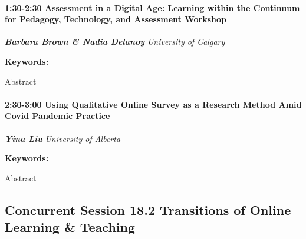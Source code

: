 \documentclass[
]{book}
\begin{document}
\begin{workshop}
\hypertarget{assessment-in-a-digital-age-learning-within-the-continuum-for-pedagogy-technology-and-assessment-workshop}{%
\paragraph*{\texorpdfstring{1:30-2:30 \textbar{} \textbf{Assessment in a
Digital Age: Learning within the Continuum for Pedagogy, Technology, and
Assessment} \textbar{}
Workshop}{1:30-2:30 \textbar{} Assessment in a Digital Age: Learning within the Continuum for Pedagogy, Technology, and Assessment \textbar{} Workshop}}\label{assessment-in-a-digital-age-learning-within-the-continuum-for-pedagogy-technology-and-assessment-workshop}}

\textbf{\emph{Barbara Brown \& Nadia Delanoy}} \textbar{}
\emph{University of Calgary}

\textbf{Keywords:}

Abstract
\end{workshop}

\begin{session}
\hypertarget{using-qualitative-online-survey-as-a-research-method-amid-covid-pandemic-practice}{%
\paragraph*{\texorpdfstring{2:30-3:00 \textbar{} \textbf{Using
Qualitative Online Survey as a Research Method Amid Covid Pandemic}
\textbar{}
Practice}{2:30-3:00 \textbar{} Using Qualitative Online Survey as a Research Method Amid Covid Pandemic \textbar{} Practice}}\label{using-qualitative-online-survey-as-a-research-method-amid-covid-pandemic-practice}}

\textbf{\emph{Yina Liu}} \textbar{} \emph{University of Alberta}

\textbf{Keywords:}

Abstract
\end{session}

\hypertarget{concurrent-session-18.2-transitions-of-online-learning-teaching}{%
\subsection*{Concurrent Session 18.2 \textbar{} Transitions of Online Learning \& Teaching}\label{concurrent-session-18.2-transitions-of-online-learning-teaching}}
\end{document}
